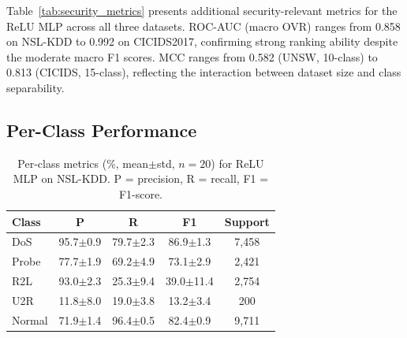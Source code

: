 \documentclass[10pt,twocolumn]{article}
\begin{document}
Table~\ref{tab:security_metrics} presents additional security-relevant
metrics for the ReLU MLP across all three datasets.
ROC-AUC (macro OVR) ranges from 0.858 on NSL-KDD to 0.992 on
CICIDS2017, confirming strong ranking ability despite the moderate
macro F1 scores.
MCC ranges from 0.582 (UNSW, 10-class) to 0.813 (CICIDS, 15-class),
reflecting the interaction between dataset size and class separability.

\begin{table}[t]
\centering
\caption{Security-relevant metrics for ReLU MLP (mean$\pm$std).
NSL-KDD and UNSW-NB15: $n{=}20$ seeds; CICIDS2017: $n{=}10$.
BA = balanced accuracy, WF1 = weighted F1.}
\label{tab:security_metrics}
\small
{}
\end{table}

\subsection{Per-Class Performance}

\begin{table}[t]
\centering
\caption{Per-class metrics (\%, mean$\pm$std, $n{=}20$) for ReLU MLP on NSL-KDD.
P = precision, R = recall, F1 = F1-score.}
\label{tab:perclass_nslkdd}
\small
\begin{tabular}{@{}lcccc@{}}
\toprule
\textbf{Class} & \textbf{P} & \textbf{R} & \textbf{F1} & \textbf{Support} \\
\midrule
DoS     & 95.7$\pm$0.9 & 79.7$\pm$2.3 & 86.9$\pm$1.3 & 7,458 \\
Probe   & 77.7$\pm$1.9 & 69.2$\pm$4.9 & 73.1$\pm$2.9 & 2,421 \\
R2L     & 93.0$\pm$2.3 & 25.3$\pm$9.4 & 39.0$\pm$11.4 & 2,754 \\
U2R     & 11.8$\pm$8.0 & 19.0$\pm$3.8 & 13.2$\pm$3.4 & 200 \\
Normal  & 71.9$\pm$1.4 & 96.4$\pm$0.5 & 82.4$\pm$0.9 & 9,711 \\
\bottomrule
\end{tabular}
\end{table}
\end{document}
